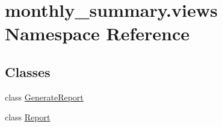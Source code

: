 \hypertarget{namespacemonthly__summary_1_1views}{\section{monthly\-\_\-summary.\-views Namespace Reference}
\label{namespacemonthly__summary_1_1views}
}
\subsection*{Classes}
\begin{DoxyCompactItemize}
\item 
class \hyperlink{classmonthly__summary_1_1views_1_1GenerateReport}{Generate\-Report}
\item 
class \hyperlink{classmonthly__summary_1_1views_1_1Report}{Report}
\end{DoxyCompactItemize}
